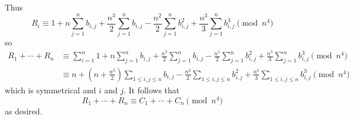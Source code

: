 Thus \[R_i\equiv 1+n\sum_{j=1}^nb_{i,j}+\frac{n^3}{2}\sum_{j=1}^nb_{i,j}-\frac{n^2}{2}\sum_{j=1}^nb_{i,j}^2+\frac{n^3}{3}\sum_{j=1}^nb_{i,j}^3\pmod{n^4}\] so
\begin{align*}
	R_1+\cdots+R_n&\equiv\sum_{i=1}^n1+n\sum_{j=1}^nb_{i,j}+\frac{n^3}{2}\sum_{j=1}^nb_{i,j}-\frac{n^2}{2}\sum_{j=1}^nb_{i,j}^2+\frac{n^3}{3}\sum_{j=1}^nb_{i,j}^3\pmod{n^4}\\
	&\equiv n+\left(n+\frac{n^3}{2}\right)\sum_{1\leq i,j\leq n}b_{i,j}-\frac{n^2}{2}\sum_{1\leq i,j\leq n}b_{i,j}^2+\frac{n^3}{3}\sum_{1\leq i,j\leq n}b_{i,j}^3\pmod{n^4}
\end{align*}
which is symmetrical and $i$ and $j$. It follows that \[R_1+\cdots+R_n\equiv C_1+\cdots+C_n\pmod{n^4}\] as desired.